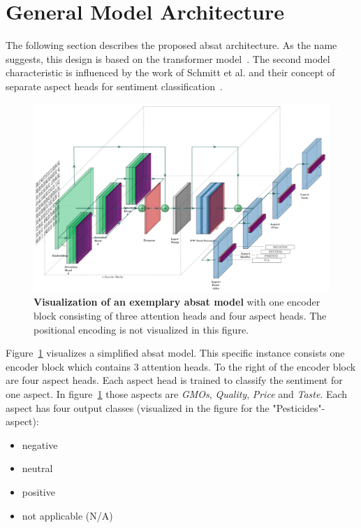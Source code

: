 \section{General Model Architecture}

The following section describes the proposed \acrfull{absat} architecture. As the name suggests, this design is based on the transformer model~\cite{Vaswani2017}. The second model characteristic is influenced by the work of Schmitt et al. and their concept of separate aspect heads for sentiment classification~\cite{Schmitt2018}.
\bigskip

\begin{figure}[htp]
    \centering
    \includegraphics[width=\textwidth]{figures/04_method/04_t-absa}
    \caption{\textbf{Visualization of an exemplary \acrfull{absat} model} with one encoder block consisting of three attention heads and four aspect heads. The positional encoding is not visualized in this figure.}
    \label{fig:04_t-absa}
\end{figure}

Figure~\ref{fig:04_t-absa} visualizes a simplified \gls{absat} model. This specific instance consists one encoder block which contains 3 attention heads. To the right of the encoder block are four aspect heads. Each aspect head is trained to classify the sentiment for one aspect. In figure~\ref{fig:04_t-absa} those aspects are \textit{GMOs}, \textit{Quality}, \textit{Price} and \textit{Taste}. Each aspect has four output classes {(visualized in the figure for the "Pesticides"-aspect)}:

\begin{itemize}
    \item negative
    \item neutral
    \item positive
    \item not applicable {(N/A)}
\end{itemize}

